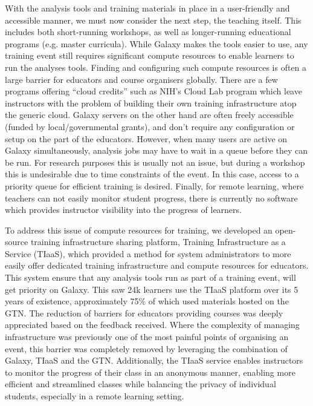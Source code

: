With the analysis tools and training materials in place in a user-friendly and accessible manner, we must now consider the next step, the teaching itself. This includes both short-running workshops, as well as longer-running educational programs (e.g. master curricula). While Galaxy makes the tools easier to use, any training event still requires significant compute resources to enable learners to run the analyses tools. Finding and configuring such compute resources is often a large barrier for educators and course organisers globally. There are a few programs offering ``cloud credits'' such as NIH's Cloud Lab program\cite{cloud-lab} which leave instructors with the problem of building their own training infrastructure atop the generic cloud. Galaxy servers on the other hand are often freely accessible (funded by local/governmental grants), and don't require any configuration or setup on the part of the educators. However, when many users are active on Galaxy simultaneously, analysis jobs may have to wait in a queue before they can be run. For research purposes this is usually not an issue, but during a workshop this is undesirable due to time constraints of the event. In this case, access to a priority queue for efficient training is desired.
Finally, for remote learning, where teachers can not easily monitor student progress, there is currently no software which provides instructor visibility into the progress of learners.

To address this issue of compute resources for training, we developed an open-source training infrastructure sharing platform, Training Infrastructure as a Service (TIaaS), which provided a method for system administrators to more easily offer dedicated training infrastructure and compute resources for educators. This system ensure that any analysis tools run as part of a training event, will get priority on Galaxy. This saw 24k learners use the TIaaS platform over its 5 years of existence, approximately 75\% of which used materials hosted on the GTN. The reduction of barriers for educators providing courses was deeply appreciated based on the feedback received. Where the complexity of managing infrastructure was previously one of the most painful points of organising an event, this barrier was completely removed by leveraging the combination of Galaxy, TIaaS and the GTN. Additionally, the TIaaS service enables instructors to monitor the progress of their class in an anonymous manner, enabling more efficient and streamlined classes while balancing the privacy of individual students, especially in a remote learning setting.

